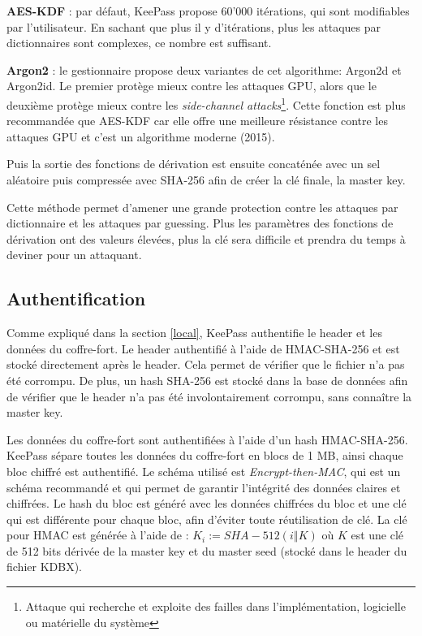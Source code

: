\textbf{AES-KDF} : par défaut, KeePass propose 60'000 itérations, qui sont modifiables par l'utilisateur. En sachant que plus il y d'itérations, plus les attaques par dictionnaires sont complexes, ce nombre est suffisant. 

\textbf{Argon2} : le gestionnaire propose deux variantes de cet algorithme: Argon2d et Argon2id. Le premier protège mieux contre les attaques GPU, alors que le deuxième protège mieux contre les \textit{side-channel attacks}\footnote{Attaque qui recherche et exploite des failles dans l'implémentation, logicielle ou matérielle du système}. Cette fonction est plus recommandée que AES-KDF car elle offre une meilleure résistance contre les attaques GPU et c'est un algorithme moderne (2015).

Puis la sortie des fonctions de dérivation est ensuite concaténée avec un sel aléatoire puis compressée avec SHA-256 afin de créer la clé finale, la master key.

Cette méthode permet d'amener une grande protection contre les attaques par dictionnaire et les attaques par guessing. Plus les paramètres des fonctions de dérivation ont des valeurs élevées, plus la clé sera difficile et prendra du temps à deviner pour un attaquant. 
\subsection{Authentification}
Comme expliqué dans la section \ref{local}, KeePass authentifie le header et les données du coffre-fort\cite{kdbx}. Le header authentifié à l'aide de HMAC-SHA-256 et est stocké directement après le header. Cela permet de vérifier que le fichier n'a pas été corrompu. De plus, un hash SHA-256 est stocké dans la base de données afin de vérifier que le header n'a pas été involontairement corrompu, sans connaître la master key.  

Les données du coffre-fort sont authentifiées à l'aide d'un hash HMAC-SHA-256. KeePass sépare toutes les données du coffre-fort en blocs de 1 MB, ainsi chaque bloc chiffré est authentifié. Le schéma utilisé est \textit{Encrypt-then-MAC}, qui est un schéma recommandé et qui permet de garantir l'intégrité des données claires et chiffrées. Le hash du bloc est généré avec les données chiffrées du bloc et une clé qui est différente pour chaque bloc, afin d'éviter toute réutilisation de clé. La clé pour HMAC est générée à l'aide de : $K_i := SHA-512(i ‖ K)$ où $K$ est une clé de 512 bits dérivée de la master key et du master seed (stocké dans le header du fichier KDBX).
